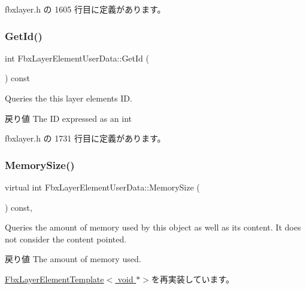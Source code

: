 fbxlayer.\+h の 1605 行目に定義があります。

\mbox{\label{class_fbx_layer_element_user_data_a6a7133826a8e21dc296e44109902e717}} 
\subsubsection{\texorpdfstring{Get\+Id()}{GetId()}}
{\footnotesize\ttfamily int Fbx\+Layer\+Element\+User\+Data\+::\+Get\+Id (\begin{DoxyParamCaption}{ }\end{DoxyParamCaption}) const\hspace{0.3cm}{\ttfamily [inline]}}

Queries the this layer element\textquotesingle{}s ID. \begin{DoxyReturn}{戻り値}
The ID expressed as an int 
\end{DoxyReturn}


 fbxlayer.\+h の 1731 行目に定義があります。

\mbox{\label{class_fbx_layer_element_user_data_aa02fc5861dec4da68293f9660d4ff13b}} 
\subsubsection{\texorpdfstring{Memory\+Size()}{MemorySize()}}
{\footnotesize\ttfamily virtual int Fbx\+Layer\+Element\+User\+Data\+::\+Memory\+Size (\begin{DoxyParamCaption}{ }\end{DoxyParamCaption}) const\hspace{0.3cm}{\ttfamily [inline]}, {\ttfamily [virtual]}}

Queries the amount of memory used by this object as well as its content. It does not consider the content pointed. \begin{DoxyReturn}{戻り値}
The amount of memory used. 
\end{DoxyReturn}


\hyperlink{class_fbx_layer_element_template_aa6a7b5ed38b51d4a903f9ed2e715ee79}{Fbx\+Layer\+Element\+Template$<$ void $\ast$$>$}を再実装しています。



